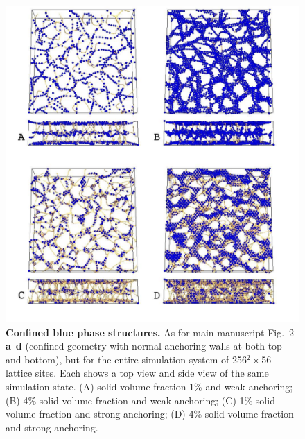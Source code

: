 \documentclass[12pt,twoside]{article}
\begin{document}
\begin{figure}[!h]
\begin{center}
\includegraphics[scale=0.42]{support-fig5.pdf}
\end{center}
\caption{\textbf{Confined blue phase structures.}
As for main manuscript Fig.~2 \textbf{a}--\textbf{d}
(confined geometry with normal
anchoring walls at both top and bottom), but for the entire simulation
system of 256$^2\times$56 lattice sites. Each shows a top view and
side view of the same simulation state. (A) solid volume fraction 1\%
and weak anchoring; (B) 4\% solid volume fraction and weak anchoring;
(C) 1\% solid volume fraction and strong anchoring; (D) 4\% solid
volume fraction and strong anchoring.}
\end{figure}

\newpage
\end{document}
